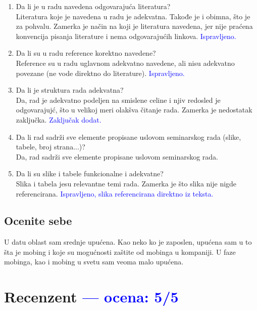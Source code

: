 \documentclass[a4paper]{report}
\newcommand{\odgovor}[1]{\textcolor{blue}{#1}}
\begin{document}
\begin{enumerate}
\item Da li je u radu navedena odgovarajuća literatura?\\
Literatura koje je navedena u radu je adekvatna. Takođe je i obimna, što je za pohvalu. Zamerka je način na koji je literatura navedena, jer nije praćena konvencija pisanja literature i nema odgovarajućih linkova. \odgovor{Ispravljeno.}

\item Da li su u radu reference korektno navedene?\\
Reference su u radu uglavnom adekvatno navedene, ali nisu adekvatno povezane (ne vode direktno do literature). \odgovor{Ispravljeno.}

\item Da li je struktura rada adekvatna?\\
Da, rad je adekvatno podeljen na smislene celine i njiv redosled je odgovarajujć, što u velikoj meri olakšva čitanje rada. Zamerka je nedostatak zaključka. \odgovor{Zaključak dodat.}

\item Da li rad sadrži sve elemente propisane uslovom seminarskog rada (slike, tabele, broj strana...)?\\
Da, rad sadrži sve elemente propisane uslovom seminarskog rada.

\item Da li su slike i tabele funkcionalne i adekvatne?\\
Slika i tabela jesu relevantne temi rada. Zamerka je što slika nije nigde referencirana. \odgovor{Ispravljeno, slika referencirana direktno iz teksta.}

\end{enumerate}

\section{Ocenite sebe}
U datu oblast sam srednje upućena. Kao neko ko je zaposlen, upućena sam u to šta je mobing i koje su mogućnosti zaštite od mobinga u kompaniji. U faze mobinga, kao i mobing u svetu sam veoma malo upućena.


\chapter{Recenzent \odgovor{--- ocena: 5/5} }
\end{document}
